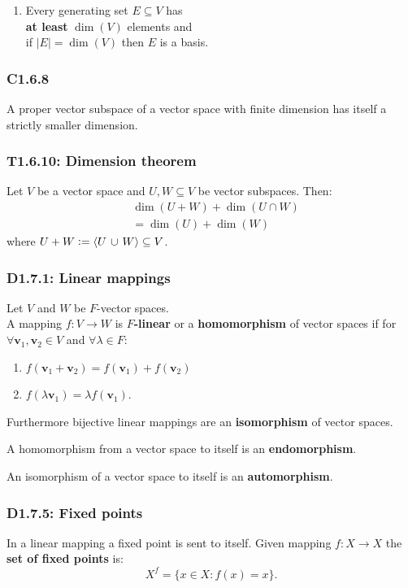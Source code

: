 \documentclass{article}
\newcommand{\deq}{\vcentcolon=}
\newcommand{\vc}[1]{\boldsymbol{#1}}
\begin{document}
\begin{multicols*}{3}
\begin{enumerate}
    \item Every generating set $E\subseteq V$ has \\
    \textbf{at least} $\dim(V)$ elements and \\
    if $|E|=\dim(V)$ then $E$ is a basis.
\end{enumerate}

\subsubsection*{C1.6.8}
A proper vector subspace of a vector space 
with finite dimension has itself a strictly smaller dimension.

\subsubsection*{T1.6.10: Dimension theorem}
Let $V$ be a vector space and 
$U,W\subseteq V$ be vector subspaces. Then:
\begin{align*}
    &\dim(U+W)+\dim(U\cap W) \\
    &=\dim(U)+\dim(W)
\end{align*}
where $U+W\deq\langle U\hspace{0.02in}
\cup\hspace{0.02in}W\rangle\subseteq V$.

\subsubsection*{D1.7.1: Linear mappings}
Let $V$ and $W$ be $F$-vector spaces. \\
A mapping $f:V\rightarrow W$ is \textbf{$F$-linear} or a
\textbf{homomorphism} of vector spaces if for
$\forall\vc{v}_1,\vc{v}_2\in V$ and $\forall\lambda\in F$:
\begin{enumerate}
    \item $f(\vc{v}_1+\vc{v}_2)=f(\vc{v}_1)+f(\vc{v}_2)$
    \item $f(\lambda\vc{v}_1)=\lambda f(\vc{v}_1)$.
\end{enumerate}
Furthermore bijective linear mappings are an \textbf{isomorphism}
of vector spaces.

A homomorphism from a vector space to itself
is an \textbf{endomorphism}.

An isomorphism of a vector space to itself
is an \textbf{automorphism}.

\subsubsection*{D1.7.5: Fixed points}
In a linear mapping a fixed point is sent to itself.
Given mapping $f:X\rightarrow X$
the \textbf{set of fixed points} is:
$$X^f=\{x\in X:f(x)=x\}.$$


\end{multicols*}
\end{document}
